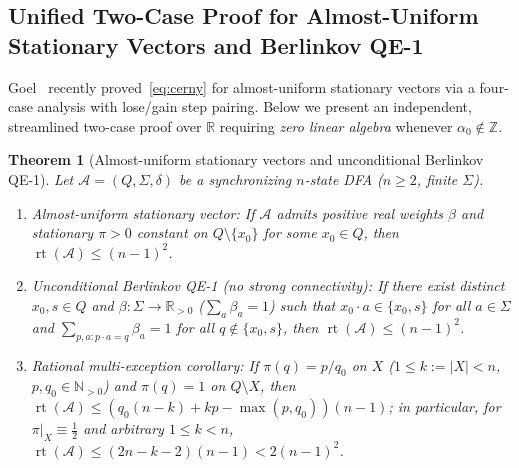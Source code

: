 \documentclass[11pt,a4paper]{article}
\newtheorem{theorem}{Theorem}[section]
\theoremstyle{definition}
\theoremstyle{remark}
\newcommand{\rt}{\operatorname{rt}}
\newcommand{\Z}{\mathbb{Z}}
\newcommand{\R}{\mathbb{R}}
\newcommand{\N}{\mathbb{N}}
\newcommand{\cA}{\mathcal{A}}
\begin{document}
\subsection{Unified Two-Case Proof for Almost-Uniform Stationary Vectors and Berlinkov QE-1}

Goel~\cite{Goel2026} recently proved~\eqref{eq:cerny} for almost-uniform stationary vectors via a four-case analysis with lose/gain step pairing. Below we present an independent, streamlined two-case proof over $\R$ requiring \emph{zero linear algebra} whenever $\alpha_0 \notin \Z$.

\begin{theorem}[Almost-uniform stationary vectors and unconditional Berlinkov QE-1]
\label{thm:almost-uniform}
Let $\cA = (Q, \Sigma, \delta)$ be a synchronizing $n$-state DFA ($n \ge 2$, finite $\Sigma$).
\begin{enumerate}[label=(\arabic*),nosep]
  \item \emph{Almost-uniform stationary vector:} If $\cA$ admits positive real weights $\beta$ and stationary $\pi > 0$ constant on $Q \setminus \{x_0\}$ for some $x_0 \in Q$, then $\rt(\cA) \le (n - 1)^2$.
  \item \emph{Unconditional Berlinkov QE-1 (no strong connectivity):} If there exist distinct $x_0, s \in Q$ and $\beta : \Sigma \to \R_{>0}$ ($\sum_a \beta_a = 1$) such that $x_0 \cdot a \in \{x_0, s\}$ for all $a \in \Sigma$ and $\sum_{p,a : p \cdot a = q} \beta_a = 1$ for all $q \notin \{x_0, s\}$, then $\rt(\cA) \le (n - 1)^2$.
  \item \emph{Rational multi-exception corollary:} If $\pi(q) = p/q_0$ on $X$ ($1 \le k := |X| < n$, $p, q_0 \in \N_{>0}$) and $\pi(q) = 1$ on $Q \setminus X$, then $\rt(\cA) \le (q_0(n - k) + k p - \max(p, q_0))(n - 1)$; in particular, for $\pi|_X \equiv \frac{1}{2}$ and arbitrary $1 \le k < n$, $\rt(\cA) \le (2n - k - 2)(n - 1) < 2(n - 1)^2$.
\end{enumerate}
\end{theorem}
\end{document}
